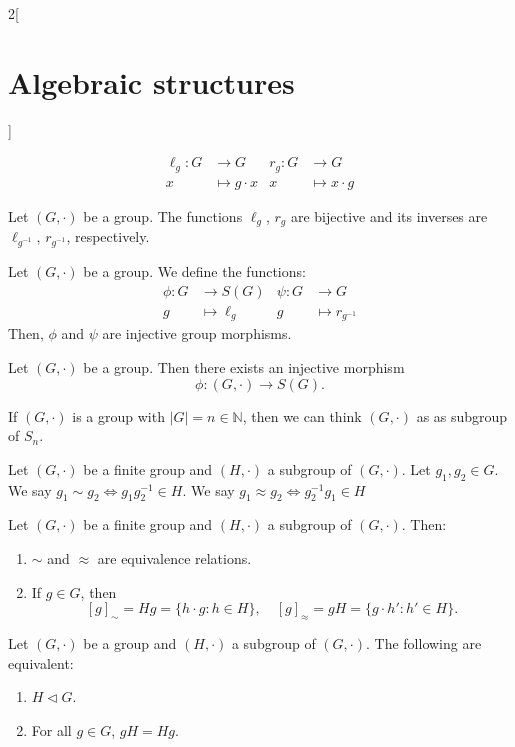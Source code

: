 \documentclass[class=article,10pt,crop=false]{standalone}
\begin{document}
\begin{multicols}{2}[\section{Algebraic structures}]
\begin{definition}
\begin{align*}
    \ell_g:G&\rightarrow G&r_g:G&\rightarrow G\\
    x&\mapsto g\cdot x &x&\mapsto x\cdot g
\end{align*}
\end{definition}
\begin{lemma}
Let $(G,\cdot)$ be a group. The functions $\ell_g$, $r_g$ are bijective and its inverses are $\ell_{g^{-1}}$, $r_{g^{-1}}$, respectively.
\end{lemma}
\begin{prop}
Let $(G,\cdot)$ be a group. We define the functions:
\begin{align*}
    \phi:G&\rightarrow S(G)&\psi:G&\rightarrow G\\
    g&\mapsto \ell_g &g&\mapsto r_{g^{-1}}
\end{align*}
Then, $\phi$ and $\psi$ are injective group morphisms.
\end{prop}
\begin{theorem}
Let $(G,\cdot)$ be a group. Then there exists an injective morphism $$\phi:(G,\cdot)\rightarrow S(G).$$
\end{theorem}
\begin{corollary}
If $(G,\cdot)$ is a group with $|G|=n\in\mathbb{N}$, then we can think $(G,\cdot)$ as as subgroup of $S_n$.
\end{corollary}
\begin{definition}
Let $(G,\cdot)$ be a finite group and $(H,\cdot)$ a subgroup of $(G,\cdot)$. Let $g_1,g_2\in G$. We say $g_1\sim g_2\iff g_1g_2^{-1}\in H$. We say $g_1\approx g_2\iff g_2^{-1}g_1\in H$
\end{definition}
\begin{lemma}
Let $(G,\cdot)$ be a finite group and $(H,\cdot)$ a subgroup of $(G,\cdot)$. Then:
\begin{enumerate}
    \item $\sim$ and $\approx$ are equivalence relations.
    \item If $g\in G$, then $$[g]_\sim=Hg=\{h\cdot g:h\in H\},\quad [g]_\approx=gH=\{g\cdot h':h'\in H\}.$$
\end{enumerate}
\end{lemma}
\begin{prop}
Let $(G,\cdot)$ be a group and $(H,\cdot)$ a subgroup of $(G,\cdot)$. The following are equivalent:
\begin{enumerate}
    \item $H\lhd G$.
    \item For all $g\in G$, $gH=Hg$.
\end{enumerate}

\end{prop}
\end{multicols}
\end{document}
